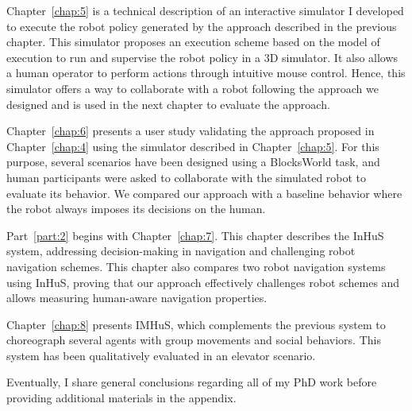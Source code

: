 Chapter~\ref{chap:5} is a technical description of an interactive simulator I developed to execute the robot policy generated by the approach described in the previous chapter. This simulator proposes an execution scheme based on the model of execution to run and supervise the robot policy in a 3D simulator. It also allows a human operator to perform actions through intuitive mouse control. Hence, this simulator offers a way to collaborate with a robot following the approach we designed and is used in the next chapter to evaluate the approach.    

Chapter~\ref{chap:6} presents a user study validating the approach proposed in Chapter~\ref{chap:4} using the simulator described in Chapter~\ref{chap:5}. For this purpose, several scenarios have been designed using a BlocksWorld task, and human participants were asked to collaborate with the simulated robot to evaluate its behavior. We compared our approach with a baseline behavior where the robot always imposes its decisions on the human. 

Part~\ref{part:2} begins with Chapter~\ref{chap:7}.
This chapter describes the InHuS system, addressing decision-making in navigation and challenging robot navigation schemes. This chapter also compares two robot navigation systems using InHuS, proving that our approach effectively challenges robot schemes and allows measuring human-aware navigation properties.


Chapter~\ref{chap:8} presents IMHuS, which complements the previous system to choreograph several agents with group movements and social behaviors. This system has been qualitatively evaluated in an elevator scenario.


Eventually, I share general conclusions regarding all of my PhD work before providing additional materials in the appendix.  


